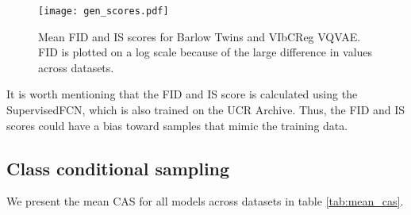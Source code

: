 \documentclass[../../thesis.tex]{subfiles}
\begin{document}
\begin{figure}[H]
    \texttt{[image: gen\_scores.pdf]}
    \centering  
    \caption{Mean FID and IS scores for Barlow Twins and VIbCReg VQVAE. FID is plotted on a log scale because of the large difference in values across datasets.}
    \label{fig:mean_gen_scores}
\end{figure}

It is worth mentioning that the FID and IS score is calculated using the SupervisedFCN, which is also trained on the UCR Archive. Thus, the FID and IS scores could have a bias toward samples that mimic the training data. 


\subsection{Class conditional sampling}

We present the mean CAS for all models across datasets in table \ref{tab:mean_cas}.
\end{document}
